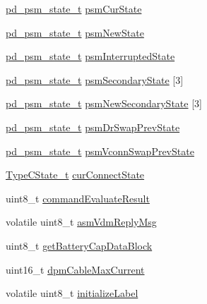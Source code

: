 \begin{DoxyCompactItemize}
\item 
\hyperlink{usb__pd__spec_8h_a46ab85ad33154cc61c1fa42d5ca24944}{pd\-\_\-psm\-\_\-state\-\_\-t} \hyperlink{struct__pd__instance_a3bc0e6fd670db006ccb2ba39dadedcc5}{psm\-Cur\-State}
\item 
\hyperlink{usb__pd__spec_8h_a46ab85ad33154cc61c1fa42d5ca24944}{pd\-\_\-psm\-\_\-state\-\_\-t} \hyperlink{struct__pd__instance_ab770921a8b608fc49a0d564a22a1aad3}{psm\-New\-State}
\item 
\hyperlink{usb__pd__spec_8h_a46ab85ad33154cc61c1fa42d5ca24944}{pd\-\_\-psm\-\_\-state\-\_\-t} \hyperlink{struct__pd__instance_a4a53a203e61b44957d56747fb7c8a312}{psm\-Interrupted\-State}
\item 
\hyperlink{usb__pd__spec_8h_a46ab85ad33154cc61c1fa42d5ca24944}{pd\-\_\-psm\-\_\-state\-\_\-t} \hyperlink{struct__pd__instance_ad376945c62a0066016cf2652e62da35a}{psm\-Secondary\-State} \mbox{[}3\mbox{]}
\item 
\hyperlink{usb__pd__spec_8h_a46ab85ad33154cc61c1fa42d5ca24944}{pd\-\_\-psm\-\_\-state\-\_\-t} \hyperlink{struct__pd__instance_a539e99b475d489e955238343ca800918}{psm\-New\-Secondary\-State} \mbox{[}3\mbox{]}
\item 
\hyperlink{usb__pd__spec_8h_a46ab85ad33154cc61c1fa42d5ca24944}{pd\-\_\-psm\-\_\-state\-\_\-t} \hyperlink{struct__pd__instance_a708b6e13ca54fe83d4200c3fff80a820}{psm\-Dr\-Swap\-Prev\-State}
\item 
\hyperlink{usb__pd__spec_8h_a46ab85ad33154cc61c1fa42d5ca24944}{pd\-\_\-psm\-\_\-state\-\_\-t} \hyperlink{struct__pd__instance_a9446b569ba4bb1c6df4367bad40bf987}{psm\-Vconn\-Swap\-Prev\-State}
\item 
\hyperlink{usb__pd__spec_8h_a9a1674d34c926c8ecd0f9f70e2da0338}{Type\-C\-State\-\_\-t} \hyperlink{struct__pd__instance_a2c4dd56715311bcb898a01a7cbec1609}{cur\-Connect\-State}
\item 
uint8\-\_\-t \hyperlink{struct__pd__instance_a48293366cd7123e1c703dd01f0921304}{command\-Evaluate\-Result}
\item 
volatile uint8\-\_\-t \hyperlink{struct__pd__instance_a3ac03447bd16031091bc4b30da45576f}{asm\-Vdm\-Reply\-Msg}
\item 
uint8\-\_\-t \hyperlink{struct__pd__instance_a26c06a89ab6d2c3fbf265abd7dfc04a3}{get\-Battery\-Cap\-Data\-Block}
\item 
uint16\-\_\-t \hyperlink{struct__pd__instance_a3638013563f1cb1208f12b5930970fa2}{dpm\-Cable\-Max\-Current}
\item 
volatile uint8\-\_\-t \hyperlink{struct__pd__instance_a2edcb21b9d568937192741d32381d2b1}{initialize\-Label}

\end{DoxyCompactItemize}
